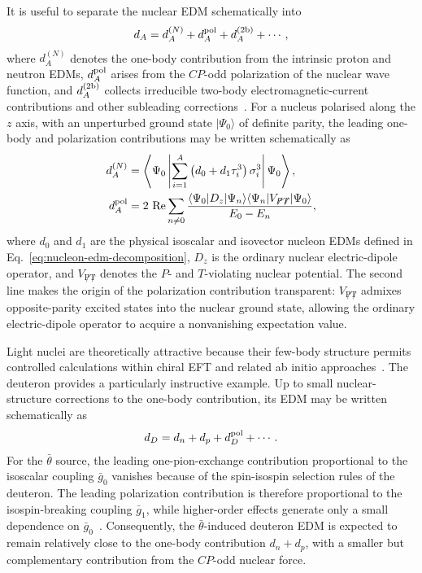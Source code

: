 \documentclass[review]{elsarticle}
\numberwithin{equation}{section}
\numberwithin{table}{section}
\numberwithin{figure}{section}
\begin{document}
It is useful to separate the nuclear EDM schematically into
\begin{align}
    d_A = d_A^{(N)} + d_A^{\rm pol} + d_A^{(2{\rm b})} +\cdots , 
    \label{eq:nuclear-EDM-decomposition}
\end{align}
where $d_A^{(N)}$ denotes the one-body contribution from the intrinsic proton and neutron EDMs, $d_A^{\rm pol}$ arises from the $CP$-odd polarization of the nuclear wave function, and $d_A^{(2{\rm b})}$ collects irreducible two-body electromagnetic-current contributions and other subleading corrections~\cite{Bsaisou:2014oka,Yamanaka:2016umw}. For a nucleus polarised along the $z$ axis, with an unperturbed ground state $|\Psi_0\rangle$ of definite parity, the leading one-body and polarization contributions may be written schematically as
\begin{align}
    d_A^{(N)}
    &=
    \left\langle\Psi_0\left| \sum_{i=1}^{A} \left(d_0+d_1\tau_i^3\right) \sigma_i^3 \right|\Psi_0\right\rangle ,
    \nonumber\\
    d_A^{\rm pol}
    &=
    2\,\operatorname{Re} \sum_{n\neq0} \frac{\langle\Psi_0|D_z|\Psi_n\rangle\langle\Psi_n|V_{\not P\not T}|\Psi_0\rangle}{E_0-E_n},
    \label{eq:nuclear-EDM-polarization}
\end{align}
where $d_0$ and $d_1$ are the physical isoscalar and isovector nucleon EDMs defined in Eq.~\eqref{eq:nucleon-edm-decomposition}, $D_z$ is the ordinary nuclear electric-dipole operator, and $V_{\not P\not T}$ denotes the $P$- and $T$-violating nuclear potential. The second line makes the origin of the polarization contribution transparent: $V_{\not P\not T}$ admixes opposite-parity excited states into the nuclear ground state, allowing the ordinary electric-dipole operator to acquire a nonvanishing expectation value.

Light nuclei are theoretically attractive because their few-body structure permits controlled calculations within chiral EFT and related ab initio approaches~\cite{Dekens:2014jka,Bsaisou:2014oka,Yamanaka:2016umw}. The deuteron provides a particularly instructive example. Up to small nuclear-structure corrections to the one-body contribution, its EDM may be written schematically as
\begin{align}
    d_D = d_n+d_p+d_D^{\rm pol}+\cdots .
    \label{eq:deuteron-EDM}
\end{align}
For the $\bar\theta$ source, the leading one-pion-exchange contribution proportional to the isoscalar coupling $\bar g_0$ vanishes because of the spin-isospin selection rules of the deuteron. The leading polarization contribution is therefore proportional to the isospin-breaking coupling $\bar g_1$, while higher-order effects generate only a small dependence on $\bar g_0$~\cite{Bsaisou:2012rg,Dekens:2014jka,Bsaisou:2014oka}. Consequently, the $\bar\theta$-induced deuteron EDM is expected to remain relatively close to the one-body contribution $d_n+d_p$, with a smaller but complementary contribution from the $CP$-odd nuclear force.
\end{document}
